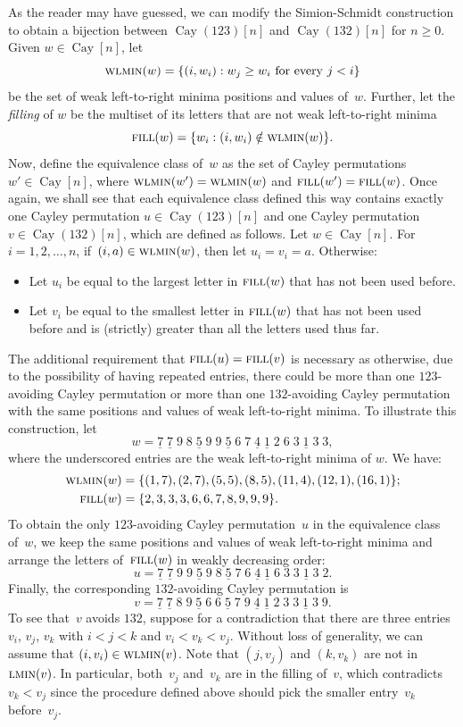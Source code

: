 \documentclass[a4paper, 11pt]{article}
\DeclareMathOperator{\Cay}{Cay}
\newcommand{\ltrmin}{\textsc{lmin}}
\newcommand{\wltrmin}{\textsc{wlmin}}
\DeclareMathOperator{\filling}{\textsc{fill}}
\theoremstyle{definition}
\begin{document}
As the reader may have guessed, we can modify the
Simion-Schmidt construction to obtain a bijection between $\Cay(123)[n]$
and $\Cay(132)[n]$ for $n\ge 0$.
Given $w\in\Cay[n]$, let
$$
\wltrmin(w) = \{ (i,w_i): w_j\ge w_i\text{ for every $j<i$}\}
$$
be the set of weak left-to-right minima positions and values of~$w$.
Further, let the \emph{filling} of $w$ be the multiset of its letters
that are not weak left-to-right minima
$$
\filling(w) = \{ w_i: (i,w_i)\notin \wltrmin(w)\}.
$$
Now, define the equivalence class of~$w$ as the set of Cayley
permutations $w'\in\Cay[n]$, where $\wltrmin(w')=\wltrmin(w)$ and
$\filling(w')=\filling(w)$. 
Once again, we shall see that each equivalence class defined this way contains
exactly one Cayley permutation $u\in\Cay(123)[n]$ and one Cayley permutation 
$v\in\Cay(132)[n]$, which are defined as follows.
Let $w\in\Cay[n]$.
For $i=1,2,\dots,n$, if~$(i,a)\in\wltrmin(w)$, then let $u_i=v_i=a$. Otherwise:
\begin{itemize}
\item Let $u_i$ be equal to the largest letter in $\filling(w)$ that has not been
used before.
\item Let $v_i$ be equal to the smallest letter in $\filling(w)$ that has not been
used before and is (strictly) greater than all the letters used thus far.
\end{itemize}
The additional requirement that $\filling(u)=\filling(v)$ is necessary as
otherwise, due to the possibility of having repeated entries, there could
be more than one $123$-avoiding Cayley permutation or more than one
$132$-avoiding Cayley permutation with the same positions and values of weak
left-to-right minima. To illustrate this construction, let
$$
w = \underline{7}\;\underline{7}\;9\;8\;\underline{5}\;9\;9\;\underline{5}\;6\;7\;\underline{4}\;\underline{1}\;2\;6\;3\;\underline{1}\;3\;3,
$$
where the underscored entries are the weak left-to-right minima of $w$. We have:
\begin{align*}
  \wltrmin(w) &= \{ (1,7),(2,7),(5,5),(8,5),(11,4),(12,1),(16,1) \};\\
  \filling(w) &= \{2,3,3,3,6,6,7,8,9,9,9\}.
\end{align*}
To obtain the only $123$-avoiding Cayley permutation~$u$ in the equivalence
class of~$w$, we keep the same positions and values of weak left-to-right minima
and arrange the letters of~$\filling(w)$ in weakly decreasing order:
$$
u=\underline{7}\;\underline{7}\;9\;9\;\underline{5}\;9\;8\;\underline{5}\;7\;6\;\underline{4}\;\underline{1}\;6\;3\;3\;\underline{1}\;3\;2.
$$
Finally, the corresponding $132$-avoiding Cayley permutation is
$$
v=\underline{7}\;\underline{7}\;8\;9\;\underline{5}\;6\;6\;\underline{5}\;7\;9\;\underline{4}\;\underline{1}\;2\;3\;3\;\underline{1}\;3\;9.
$$
To see that~$v$ avoids $132$, suppose for a contradiction that there are
three entries $v_i$, $v_j$, $v_k$ with $i<j<k$ and $v_i<v_k<v_j$.
Without loss of generality, we can assume that $(i,v_i)\in\wltrmin(v)$.
Note that $(j,v_j)$ and $(k,v_k)$ are not in $\ltrmin(v)$.
In particular, both~$v_j$ and~$v_k$ are in the filling of~$v$, which
contradicts $v_k<v_j$ since the procedure defined above
should pick the smaller entry~$v_k$ before~$v_j$.
\end{document}
